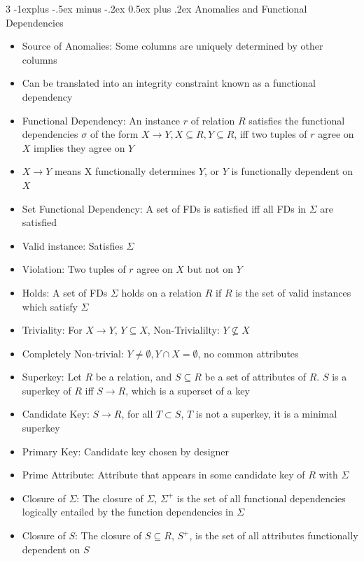 \documentclass[10pt, landscape]{article}
\makeatletter
\renewcommand{\section}{\@startsection{section}{1}{0mm}%
                                {-1ex plus -.5ex minus -.2ex}%
                                {0.5ex plus .2ex}%
                                {\normalfont\large\bfseries}}
\renewcommand{\section}{\@startsection{section}{2}{0mm}%
                                {-1explus -.5ex minus -.2ex}%
                                {0.5ex plus .2ex}%
                                {\normalfont\normalsize\bfseries}}
\makeatother
\begin{document}
\begin{multicols*}{3}
\section{Anomalies and Functional Dependencies}
\begin{itemize}
    \item Source of Anomalies: Some columns are uniquely determined by other columns
    \item Can be translated into an integrity constraint known as a functional dependency
    \item Functional Dependency: An instance $r$ of relation $R$ satisfies the functional dependencies $\sigma$ of the form $X \rightarrow Y, X \subseteq R, Y \subseteq R$, iff two tuples of $r$ agree on $X$ implies they agree on $Y$
    \item $X \rightarrow Y$ means X functionally determines $Y$, or $Y$ is functionally dependent on $X$
    \item Set Functional Dependency: A set of FDs is satisfied iff all FDs in $\Sigma$ are satisfied
    \item Valid instance: Satisfies $\Sigma$
    \item Violation: Two tuples of $r$ agree on $X$ but not on $Y$
    \item Holds: A set of FDs $\Sigma$ holds on a relation $R$ if $R$ is the set of valid instances which satisfy $\Sigma$
    \item Triviality: For $X \rightarrow Y$, $Y \subseteq X$, Non-Trivialilty: $Y \not\subseteq X$
    \item Completely Non-trivial: $Y \neq \emptyset, Y \cap X = \emptyset$, no common attributes
    \item Superkey: Let $R$ be a relation, and $S \subseteq R$ be a set of attributes of $R$. $S$ is a superkey of $R$ iff $S \rightarrow R$, which is a superset of a key
    \item Candidate Key: $S \rightarrow R$, for all $T \subset S$, $T$ is not a superkey, it is a minimal superkey
    \item Primary Key: Candidate key chosen by designer
    \item Prime Attribute: Attribute that appears in some candidate key of $R$ with $\Sigma$
    \item Closure of $\Sigma$: The closure of $\Sigma$, $\Sigma^+$ is the set of all functional dependencies logically entailed by the function dependencies in $\Sigma$
    \item Closure of $S$: The closure of $S \subseteq R$, $S^+$, is the set of all attributes functionally dependent on $S$

\end{itemize}
\end{multicols*}
\end{document}
